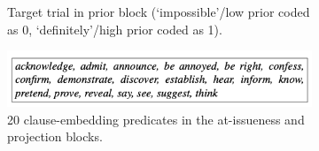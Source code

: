 \documentclass[11pt,fleqn]{article}
\newcommand{\6}{\mbox{$[\hspace*{-.6mm}[$}}
\newcommand{\9}{\mbox{$]\hspace*{-.6mm}]$}}
\begin{document}
\begin{figure}[h!]
\centering

\begin{subfigure}[t]{0.5\textwidth}
        \centering
{}
\caption{Target trial in prior block (`impossible'/low prior coded as 0, `definitely'/high prior coded as 1).}\label{fig-exp1-prior}
\end{subfigure}
 \par\bigskip
\begin{subfigure}[t]{0.8\textwidth}
\par\bigskip
\centering
\includegraphics[width=10cm]{figures/predicates}
\caption{20 clause-embedding predicates in the at-issueness and projection blocks.}\label{fig-exp1-predicates}
 \end{subfigure}
 \par\bigskip
\begin{subfigure}[t]{0.5\textwidth}
\par\bigskip
\centering

\end{subfigure}
\end{figure}
\end{document}
